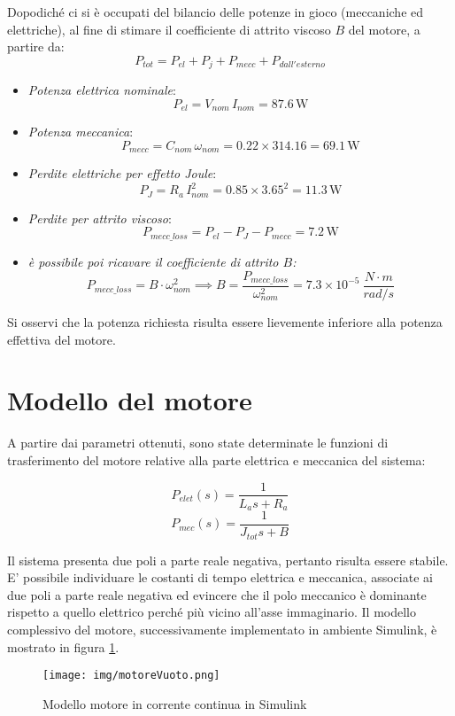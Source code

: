 \documentclass{article}
\begin{document}
Dopodiché ci si è occupati del bilancio delle potenze in gioco (meccaniche ed elettriche), al fine di stimare il coefficiente di attrito viscoso $B$ del motore, a partire da: 
 $$P_{tot} = P_{el} + P_{j} + P_{mecc} + P_{dall'esterno}$$ 
\begin{itemize}
\item \textit{Potenza elettrica nominale}: \[P_{el}=V_{nom}\,I_{nom}=87.6\,\mathrm{W}\]
  \item \textit{Potenza meccanica}: 
  \[ P_{mecc}=C_{nom}\,\omega_{nom}=0.22\times314.16=69.1\,\mathrm{W}\]
  \item \textit{Perdite elettriche per effetto Joule}: \[P_{J}=R_a\,I_{nom}^2=0.85\times3.65^2=11.3\,\mathrm{W}\]
  \item \textit{Perdite per attrito viscoso}: \[P_{mecc\_loss}=P_{el}-P_{J}-P_{mecc}=7.2\,\mathrm{W}\]
  \item \textit{è possibile poi ricavare il coefficiente di attrito $B$:}  $$P_{mecc\_loss} = \textit{B}\cdot \omega_{nom}^2 \implies B = \frac{P_{mecc\_loss}}{\omega_{nom}^2} = 7.3\times10^{-5}~ \frac{N\cdot m}{rad/s}$$
\end{itemize}

Si osservi che la potenza richiesta risulta essere lievemente inferiore alla potenza effettiva del motore.

\newpage

\section{Modello del motore}
A partire dai parametri ottenuti, sono state determinate le funzioni di trasferimento del motore relative alla parte elettrica e meccanica del sistema:

$$P_{elet}(s) = \frac{1}{L_as + R_a}$$
$$P_{mec}(s) = \frac{1}{J_{tot}s + B}$$ 

Il sistema presenta due poli a parte reale negativa, pertanto risulta essere stabile. E’ possibile individuare le costanti di tempo elettrica e meccanica, associate ai due poli a parte reale negativa ed evincere che il polo meccanico è dominante rispetto a quello elettrico perché più vicino all'asse immaginario.
Il modello complessivo del motore, successivamente implementato in ambiente Simulink, è mostrato in figura \ref{fig:modello_simulink}.
\begin{figure}[h!]
\centering
    \texttt{[image: img/motoreVuoto.png]} 
    \caption{Modello motore in corrente continua in Simulink}
    \label{fig:modello_simulink}
\end{figure}
\end{document}

